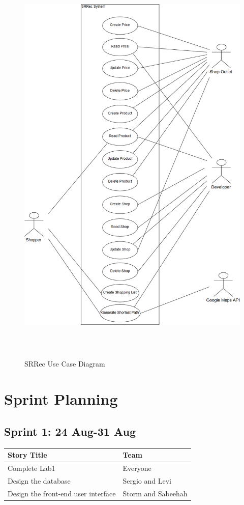 \documentclass[12pt]{article}
\begin{document}
\begin{figure}[H]
  \includegraphics[width=\textwidth ,height=20cm]{UseCaseDiagram.png}
  \centering
  \caption{SRRec Use Case Diagram}
  \label{fig:Use Case Diagram}
\end{figure}


\section{Sprint Planning}
\subsection{Sprint 1: 24 Aug-31 Aug}
\begin{tabu} to \textwidth{| X[l] | X[l] |} \hline
\textbf{Story Title} & \textbf{Team}\\
\hline
Complete Lab1 & Everyone\\
\hline
Design the database & Sergio and Levi\\
\hline
Design the front-end user interface & Storm and Sabeehah\\
\hline
\end{tabu}
\end{document}
